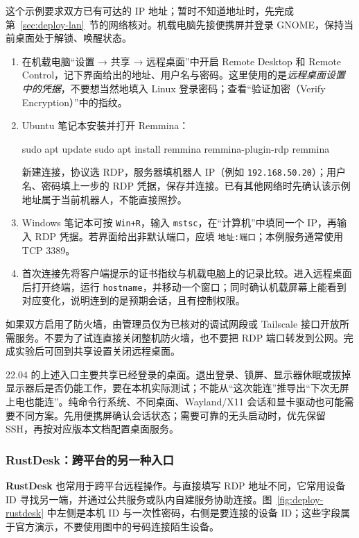 \begin{example}
这个示例要求双方已有可达的 IP 地址；暂时不知道地址时，先完成第~\ref{sec:deploy-lan}~节的网络核对。机载电脑先接便携屏并登录 GNOME，保持当前桌面处于解锁、唤醒状态。
\begin{enumerate}
  \item 在机载电脑“设置 → 共享 → 远程桌面”中开启 Remote Desktop 和 Remote Control，记下界面给出的地址、用户名与密码。这里使用的是\emph{远程桌面设置中的凭据}，不要想当然地填入 Linux 登录密码；查看“验证加密（Verify Encryption）”中的指纹。
  \item Ubuntu 笔记本安装并打开 Remmina：
\begin{tbash}
sudo apt update
sudo apt install remmina remmina-plugin-rdp
remmina
\end{tbash}
  新建连接，协议选 RDP，服务器填机器人 IP（例如 \texttt{192.168.50.20}）；用户名、密码填上一步的 RDP 凭据，保存并连接。已有其他网络时先确认该示例地址属于当前机器人，不能直接照抄。
  \item Windows 笔记本可按 \texttt{Win+R}，输入 \texttt{mstsc}，在“计算机”中填同一个 IP，再输入 RDP 凭据。若界面给出非默认端口，应填 \texttt{地址:端口}；本例服务通常使用 TCP 3389。
  \item 首次连接先将客户端提示的证书指纹与机载电脑上的记录比较。进入远程桌面后打开终端，运行 \texttt{hostname}，并移动一个窗口；同时确认机载屏幕上能看到对应变化，说明连到的是预期会话，且有控制权限。
\end{enumerate}
如果双方启用了防火墙，由管理员仅为已核对的调试网段或 Tailscale 接口开放所需服务。不要为了试连直接关闭整机防火墙，也不要把 RDP 端口转发到公网。完成实验后可回到共享设置关闭远程桌面。
\end{example}

\begin{note}
22.04 的上述入口主要共享已经登录的桌面。退出登录、锁屏、显示器休眠或拔掉显示器后是否仍能工作，要在本机实际测试；不能从“这次能连”推导出“下次无屏上电也能连”。纯命令行系统、不同桌面、Wayland/X11 会话和显卡驱动也可能需要不同方案。先用便携屏确认会话状态；需要可靠的无头启动时，优先保留 SSH，再按对应版本文档配置桌面服务。
\end{note}

\subsubsection{RustDesk：跨平台的另一种入口}

\textbf{RustDesk} 也常用于跨平台远程操作。与直接填写 RDP 地址不同，它常用设备 ID 寻找另一端，并通过公共服务或队内自建服务协助连接。图~\ref{fig:deploy-rustdesk} 中左侧是本机 ID 与一次性密码，右侧是要连接的设备 ID；这些字段属于官方演示，不要使用图中的号码连接陌生设备。

